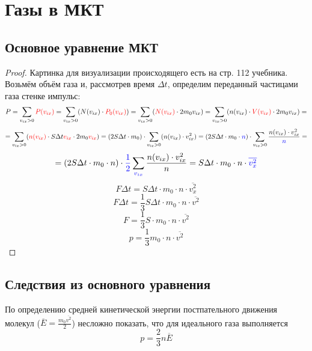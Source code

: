 \section{Газы в МКТ}




\subsection{Основное уравнение МКТ}
\begin{proof}
	Картинка для визуализации происходящего есть на стр. 112 учебника. Возьмём объём газа и, рассмотрев время $\Delta t$, определим переданный частицами газа стенке импульс:
	\[\displaystyle P = \sum_{v_{ix}>0}{\color{red}P(v_{ix})}=\sum_{v_{ix}>0}(N(v_{ix})\cdot{\color{red}P_0(v_{ix})})=\sum_{v_{ix}>0}({\color{red}N(v_{ix})}\cdot2 m_0 v_{ix})=
	\sum_{v_{ix}>0}(n(v_{ix})\cdot {\color{red}V(v_{ix})}\cdot2 m_0 v_{ix})=
	\]
	\[=\sum_{v_{ix}>0}({\color{red}n(v_{ix})}\cdot S \Delta t {\color{red}v_{ix}}\cdot2 m_0 {\color{red}v_{ix}})=
	(2S \Delta t \cdot m_0) \cdot \sum_{v_{ix}>0}(n(v_{ix})\cdot v_{ix}^2)=
	(2S \Delta t \cdot m_0 \cdot {\color{blue}n}) \cdot \sum_{v_{ix}>0}\frac{n(v_{ix})\cdot v_{ix}^2}{\color{blue}n}=\]
	\[
	=(2S \Delta t \cdot m_0 \cdot n) \cdot {\color{blue}\frac{1}{2}}\sum_{\color{blue}v_{ix}}\frac{n(v_{ix})\cdot v_{ix}^2}{n}=
	S \Delta t \cdot m_0 \cdot n \cdot {\color{blue}\overline{v_{x}^2}}
	\]
	\[F \Delta t = S \Delta t \cdot m_0 \cdot n \cdot \overline{v_{x}^2}\]
	\[F \Delta t = \frac{1}{3} S \Delta t \cdot m_0 \cdot n \cdot \overline{v^2}\]
	\[F = \frac{1}{3} S \cdot m_0 \cdot n \cdot \overline{v^2}\]
	\[p = \frac{1}{3} m_0 \cdot n \cdot \overline{v^2}\]
\end{proof}


\subsection{Следствия из основного уравнения}
По определению средней кинетической энергии постпательного движения молекул ($\displaystyle \overline{E}=\frac{m_0\overline{v^2}}{2}$) несложно показать, что для идеального газа выполняется
\begin{equation}\label{eq:p=2/3nE}
	p = \frac{2}{3} n \overline{E}
\end{equation}

